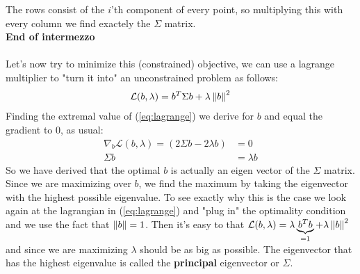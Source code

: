 			The rows consist of the $i$'th component of every point, so multiplying this with every column we find exactely the $\Sigma$ matrix.\\
			\textbf{End of intermezzo}\\\\
			 Let's now try to minimize this (constrained) objective, we can use a lagrange multiplier to "turn it into" an unconstrained problem as follows:
			\begin{equation}
				\label{eq:lagrange}
				\begin{split}
					\mathcal{L}(b,\lambda) = b^T\Sigma b + \lambda\left\lVert b\right\rVert^2
				\end{split}			
			\end{equation}
			Finding the extremal value of (\ref{eq:lagrange}) we derive for $b$ and equal the gradient to 0, as usual:
			\begin{equation}
				\begin{split}
					\nabla_b\mathcal{L}(b,\lambda) = (2\Sigma b - 2\lambda b) &= 0\\
					\Sigma b &= \lambda b
				\end{split}			
			\end{equation}
			So we have derived that the optimal $b$ is actually an eigen vector of the $\Sigma$ matrix. Since we are maximizing over $b$, we find the maximum by taking the eigenvector with the highest possible eigenvalue. To see exactly why this is the case we look again at the lagrangian in (\ref{eq:lagrange}) and "plug in" the optimality condition and we use the fact that $\left\lVert b\right\rVert=1$. Then it's easy to that $\mathcal{L}(b,\lambda) = \lambda \underbrace{b^Tb}_{=1} + \lambda\left\lVert b\right\rVert^2$ and since we are maximizing $\lambda$ should be as big as possible. The eigenvector that has the highest eigenvalue is called the \textbf{principal} eigenvector or $\Sigma$.
